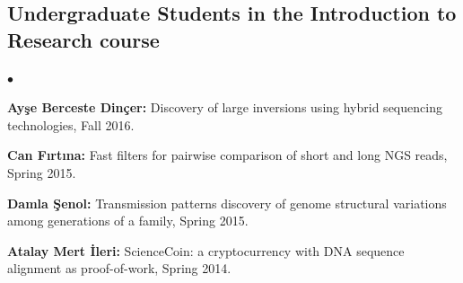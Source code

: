 \documentclass[margin,line]{res}
\newenvironment{list2}{
  \begin{list}{$\bullet$}{%
      \setlength{\itemsep}{0in}
      \setlength{\parsep}{0in} \setlength{\parskip}{0in}
      \setlength{\topsep}{0in} \setlength{\partopsep}{0in} 
      \setlength{\leftmargin}{0.2in}}}{\end{list}}
\begin{document}
\begin{resume}
\vspace*{-.4cm}
  \subsection{\small \sc Undergraduate Students in the Introduction to Research course}
  \begin{list2}
  \item
    {\bf Ayşe Berceste Dinçer:} Discovery of large inversions using hybrid sequencing technologies, Fall 2016.
  \item
    {\bf Can Fırtına:} Fast filters for pairwise comparison of short and long NGS reads, Spring 2015.
  \item
    {\bf Damla Şenol:} Transmission patterns discovery of genome structural variations among generations of a family, Spring 2015.
  \item
    {\bf Atalay Mert İleri:} ScienceCoin: a cryptocurrency with DNA sequence alignment as proof-of-work, Spring 2014.
  \end{list2}
\vspace*{-.4cm}

\end{resume}
\end{document}
